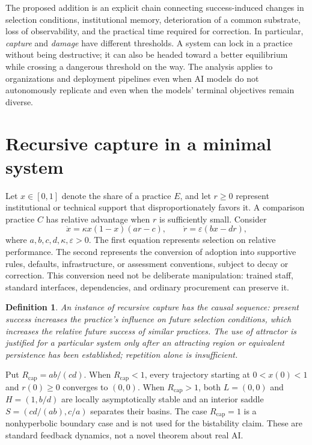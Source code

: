 \documentclass[11pt]{article}
\newtheorem{definition}{Definition}
\begin{document}
The proposed addition is an explicit chain connecting success-induced changes in selection conditions, institutional memory, deterioration of a common substrate, loss of observability, and the practical time required for correction. In particular, \emph{capture} and \emph{damage} have different thresholds. A system can lock in a practice without being destructive; it can also be headed toward a better equilibrium while crossing a dangerous threshold on the way. The analysis applies to organizations and deployment pipelines even when AI models do not autonomously replicate and even when the models' terminal objectives remain diverse.

\section{Recursive capture in a minimal system}

Let $x\in[0,1]$ denote the share of a practice $E$, and let $r\geq 0$ represent institutional or technical support that disproportionately favors it. A comparison practice $C$ has relative advantage when $r$ is sufficiently small. Consider
\begin{equation}\label{eq:core}
\dot x=\kappa x(1-x)(ar-c),\qquad
\dot r=\varepsilon(bx-dr),
\end{equation}
where $a,b,c,d,\kappa,\varepsilon>0$. The first equation represents selection on relative performance. The second represents the conversion of adoption into supportive rules, defaults, infrastructure, or assessment conventions, subject to decay or correction. This conversion need not be deliberate manipulation: trained staff, standard interfaces, dependencies, and ordinary procurement can preserve it.

\begin{definition}
An instance of \emph{recursive capture} has the causal sequence: present success increases the practice's influence on future selection conditions, which increases the relative future success of similar practices. The use of \emph{attractor} is justified for a particular system only after an attracting region or equivalent persistence has been established; repetition alone is insufficient.
\end{definition}

Put $R_{\mathrm{cap}}=ab/(cd)$. When $R_{\mathrm{cap}}<1$, every trajectory starting at $0<x(0)<1$ and $r(0)\geq0$ converges to $(0,0)$. When $R_{\mathrm{cap}}>1$, both $L=(0,0)$ and $H=(1,b/d)$ are locally asymptotically stable and an interior saddle $S=(cd/(ab),c/a)$ separates their basins. The case $R_{\mathrm{cap}}=1$ is a nonhyperbolic boundary case and is not used for the bistability claim. These are standard feedback dynamics, not a novel theorem about real AI.
\end{document}

